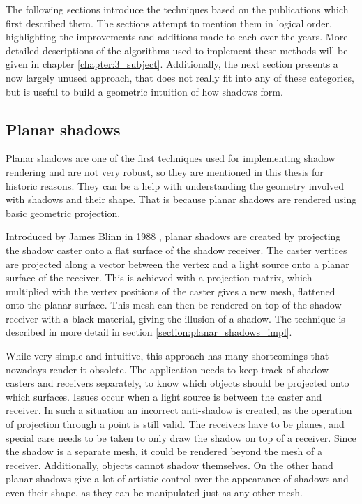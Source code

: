 The following sections introduce the techniques based on the publications which first described them. The sections attempt to mention them in logical order, highlighting the improvements and additions made to each over the years. More detailed descriptions of the algorithms used to implement these methods will be given in chapter \ref{chapter:3_subject}. Additionally, the next section presents a now largely unused approach, that does not really fit into any of these categories, but is useful to build a geometric intuition of how shadows form.

\subsection{Planar shadows} \label{section:planar_shadows}
Planar shadows are one of the first techniques used for implementing shadow rendering and are not very robust, so they are mentioned in this thesis for historic reasons. They can be a help with understanding the geometry involved with shadows and their shape. That is because planar shadows are rendered using basic geometric projection.

Introduced by James Blinn in 1988 \cite{bib:article:blinn_shadows}, planar shadows are created by projecting the shadow caster onto a flat surface of the shadow receiver. The caster vertices are projected along a vector between the vertex and a light source onto a planar surface of the receiver. This is achieved with a projection matrix, which multiplied with the vertex positions of the caster gives a new mesh, flattened onto the planar surface. This mesh can then be rendered on top of the shadow receiver with a black material, giving the illusion of a shadow. The technique is described in more detail in section \ref{section:planar_shadows_impl}.

While very simple and intuitive, this approach has many shortcomings that nowadays render it obsolete. The application needs to keep track of shadow casters and receivers separately, to know which objects should be projected onto which surfaces. Issues occur when a light source is between the caster and receiver. In such a situation an incorrect anti-shadow is created, as the operation of projection through a point is still valid. The receivers have to be planes, and special care needs to be taken to only draw the shadow on top of a receiver. Since the shadow is a separate mesh, it could be rendered beyond the mesh of a receiver. Additionally, objects cannot shadow themselves. On the other hand planar shadows give a lot of artistic control over the appearance of shadows and even their shape, as they can be manipulated just as any other mesh.

